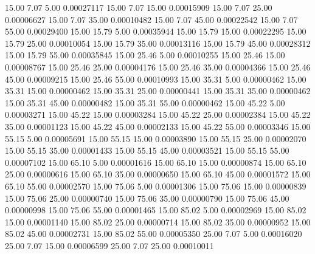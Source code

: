      15.00      7.07      5.00     0.00027117
     15.00      7.07     15.00     0.00015909
     15.00      7.07     25.00     0.00006627
     15.00      7.07     35.00     0.00010482
     15.00      7.07     45.00     0.00022542
     15.00      7.07     55.00     0.00029400
     15.00     15.79      5.00     0.00035944
     15.00     15.79     15.00     0.00022295
     15.00     15.79     25.00     0.00010054
     15.00     15.79     35.00     0.00013116
     15.00     15.79     45.00     0.00028312
     15.00     15.79     55.00     0.00035845
     15.00     25.46      5.00     0.00010255
     15.00     25.46     15.00     0.00008767
     15.00     25.46     25.00     0.00004176
     15.00     25.46     35.00     0.00004366
     15.00     25.46     45.00     0.00009215
     15.00     25.46     55.00     0.00010993
     15.00     35.31      5.00     0.00000462
     15.00     35.31     15.00     0.00000462
     15.00     35.31     25.00     0.00000441
     15.00     35.31     35.00     0.00000462
     15.00     35.31     45.00     0.00000482
     15.00     35.31     55.00     0.00000462
     15.00     45.22      5.00     0.00003271
     15.00     45.22     15.00     0.00003284
     15.00     45.22     25.00     0.00002384
     15.00     45.22     35.00     0.00001123
     15.00     45.22     45.00     0.00002133
     15.00     45.22     55.00     0.00003346
     15.00     55.15      5.00     0.00005691
     15.00     55.15     15.00     0.00003890
     15.00     55.15     25.00     0.00002070
     15.00     55.15     35.00     0.00001433
     15.00     55.15     45.00     0.00003521
     15.00     55.15     55.00     0.00007102
     15.00     65.10      5.00     0.00001616
     15.00     65.10     15.00     0.00000874
     15.00     65.10     25.00     0.00000616
     15.00     65.10     35.00     0.00000650
     15.00     65.10     45.00     0.00001572
     15.00     65.10     55.00     0.00002570
     15.00     75.06      5.00     0.00001306
     15.00     75.06     15.00     0.00000839
     15.00     75.06     25.00     0.00000740
     15.00     75.06     35.00     0.00000790
     15.00     75.06     45.00     0.00000998
     15.00     75.06     55.00     0.00001465
     15.00     85.02      5.00     0.00002969
     15.00     85.02     15.00     0.00001140
     15.00     85.02     25.00     0.00000714
     15.00     85.02     35.00     0.00000952
     15.00     85.02     45.00     0.00002731
     15.00     85.02     55.00     0.00005350
     25.00      7.07      5.00     0.00016020
     25.00      7.07     15.00     0.00006599
     25.00      7.07     25.00     0.00010011
